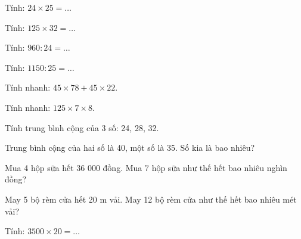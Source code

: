 \begin{ex}
Tính: $24 \times 25 = \dots$
\end{ex}

\begin{ex}
Tính: $125 \times 32 = \dots$
\end{ex}

\begin{ex}
Tính: $960 : 24 = \dots$
\end{ex}

\begin{ex}
Tính: $1150 : 25 = \dots$
\end{ex}

\begin{ex}
Tính nhanh: $45 \times 78 + 45 \times 22$.
\end{ex}

\begin{ex}
Tính nhanh: $125 \times 7 \times 8$.
\end{ex}

\begin{ex}
Tính trung bình cộng của 3 số: 24, 28, 32.
\end{ex}

\begin{ex}
Trung bình cộng của hai số là 40, một số là 35. Số kia là bao nhiêu?
\end{ex}

\begin{ex}
Mua 4 hộp sữa hết 36 000 đồng. Mua 7 hộp sữa như thế hết bao nhiêu nghìn đồng?
\end{ex}

\begin{ex}
May 5 bộ rèm cửa hết 20 m vải. May 12 bộ rèm cửa như thế hết bao nhiêu mét vải?
\end{ex}

\begin{ex}
Tính: $3500 \times 20 = \dots$
\end{ex}

